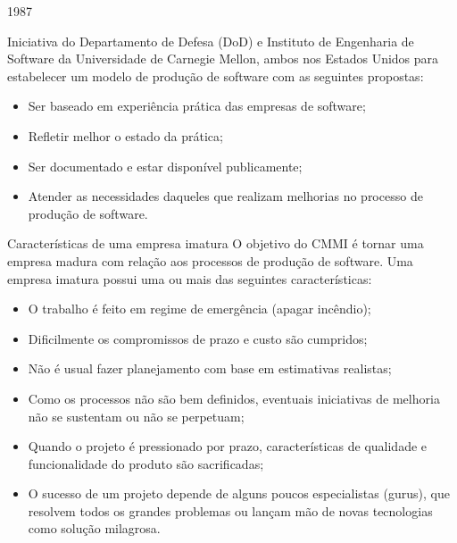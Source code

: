 \lecturetitle{\insertlecture}{\course}

\frame{\maketitle}

\begin{frame}{\insertlecture}{1987}

Iniciativa do Departamento de Defesa (DoD) e Instituto de Engenharia
de Software da Universidade de Carnegie Mellon, ambos nos Estados
Unidos para estabelecer um modelo de produção de software com as
seguintes propostas:

\begin{itemize}[<+->]
\item Ser baseado em experiência prática das empresas de software;
\item Refletir melhor o estado da prática;
\item Ser documentado e estar disponível publicamente;
\item Atender as necessidades daqueles que realizam melhorias no processo de produção de software.
\end{itemize}

\end{frame}

\begin{frame}{Características de uma empresa imatura}
\footnotesize
O objetivo do CMMI é tornar uma empresa madura com relação aos
 processos de produção de software. Uma empresa imatura possui uma ou
 mais das seguintes características:

\begin{itemize}[<+->]
\item O trabalho é feito em regime de emergência (apagar incêndio);
\item Dificilmente os compromissos de prazo e custo são cumpridos;
\item Não é usual fazer planejamento com base em estimativas realistas;
\item Como os processos não são bem definidos, eventuais iniciativas 
      de melhoria não se sustentam ou não se perpetuam;
\item Quando o projeto é pressionado por prazo, características de 
      qualidade e funcionalidade do produto são sacrificadas;
\item O sucesso de um projeto depende de alguns poucos especialistas (gurus), 
      que resolvem todos os grandes problemas ou lançam mão de novas 
      tecnologias como solução milagrosa.
\end{itemize}

\end{frame}


